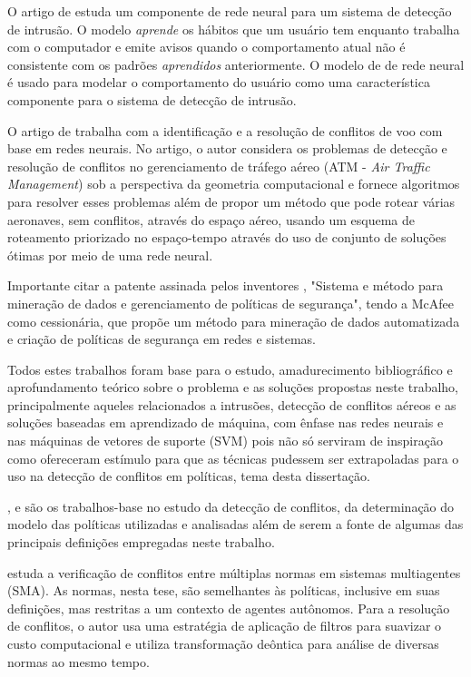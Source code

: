 O artigo de \cite{debar_neural_1992} estuda um componente de rede neural para um sistema de detecção de intrusão. O modelo \textit{aprende} os hábitos que um usuário tem enquanto trabalha com o computador e emite avisos quando o comportamento atual não é consistente com os padrões \textit{aprendidos} anteriormente. O modelo de de rede neural  é usado para modelar o comportamento do usuário como uma característica componente para o sistema de detecção de intrusão.

O artigo de \cite{chen_flight_2011} trabalha com a identificação e a resolução de conflitos de voo com base em redes neurais. No artigo, o autor considera os problemas de detecção e resolução de conflitos no gerenciamento de tráfego aéreo (ATM - \textit{Air Traffic Management}) sob a perspectiva da geometria computacional e fornece algoritmos para resolver esses problemas além de propor um método que pode rotear várias aeronaves, sem conflitos, através do espaço aéreo, usando um esquema de roteamento priorizado no espaço-tempo através do uso de conjunto de soluções ótimas por meio de uma rede neural.

Importante citar a patente assinada pelos inventores \cite{ahuja_54_nodate}, "Sistema e método para mineração de dados e gerenciamento de políticas de segurança", tendo a  McAfee como cessionária, que propõe um método para mineração de dados automatizada e criação de políticas de segurança em redes e sistemas.

Todos estes trabalhos foram base para o estudo, amadurecimento bibliográfico e aprofundamento teórico sobre o problema e as soluções propostas neste trabalho, principalmente aqueles relacionados a intrusões, detecção de conflitos aéreos e as soluções baseadas em aprendizado de máquina, com ênfase nas redes neurais e nas máquinas de vetores de suporte (SVM)  pois não só serviram de inspiração como ofereceram estímulo para que as técnicas pudessem ser extrapoladas para o uso na detecção de conflitos em políticas, tema desta dissertação.

\cite{sarkis2017}, \cite{eduardo2017} e \cite{sarkis:artigo:2016} são os trabalhos-base no estudo da detecção de conflitos, da determinação do modelo das políticas utilizadas e analisadas além de serem a fonte de algumas das principais definições empregadas neste trabalho. 

\cite{eduardo2017} estuda a verificação de conflitos entre múltiplas normas em sistemas multiagentes (SMA). As normas, nesta tese, são semelhantes às políticas, inclusive em suas definições, mas restritas a um contexto de agentes autônomos. Para a resolução de conflitos, o autor usa uma estratégia de aplicação de filtros para suavizar o custo computacional e utiliza transformação deôntica para análise de diversas normas ao mesmo tempo.

